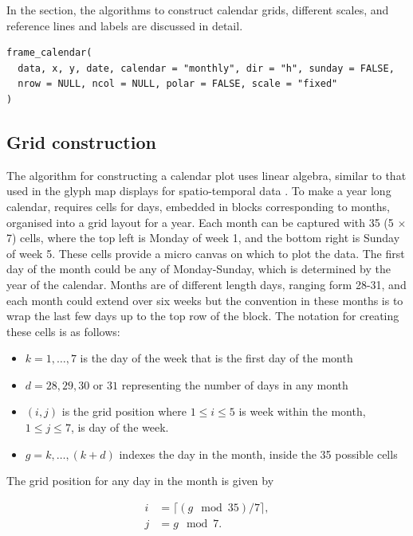 \documentclass[article]{jss}
\providecommand{\tightlist}{%
  \setlength{\itemsep}{0pt}\setlength{\parskip}{0pt}}
\begin{document}
In the section, the algorithms to construct calendar grids, different
scales, and reference lines and labels are discussed in detail.

\begin{verbatim}
frame_calendar(
  data, x, y, date, calendar = "monthly", dir = "h", sunday = FALSE, 
  nrow = NULL, ncol = NULL, polar = FALSE, scale = "fixed"
)
\end{verbatim}

\subsection{Grid construction}\label{grid-construction}

The algorithm for constructing a calendar plot uses linear algebra,
similar to that used in the glyph map displays for spatio-temporal data
\citep{Wickham2012glyph}. To make a year long calendar, requires cells
for days, embedded in blocks corresponding to months, organised into a
grid layout for a year. Each month can be captured with 35 (5 \(\times\)
7) cells, where the top left is Monday of week 1, and the bottom right
is Sunday of week 5. These cells provide a micro canvas on which to plot
the data. The first day of the month could be any of Monday-Sunday,
which is determined by the year of the calendar. Months are of different
length days, ranging form 28-31, and each month could extend over six
weeks but the convention in these months is to wrap the last few days up
to the top row of the block. The notation for creating these cells is as
follows:

\begin{itemize}
\tightlist
\item
  \(k = 1, \dots , 7\) is the day of the week that is the first day of
  the month
\item
  \(d = 28, 29, 30\) or \(31\) representing the number of days in any
  month
\item
  \((i, j)\) is the grid position where \(1 \le i \le 5\) is week within
  the month, \(1 \le j \le 7\), is day of the week.
\item
  \(g = k, \dots,(k+d)\) indexes the day in the month, inside the 35
  possible cells
\end{itemize}

The grid position for any day in the month is given by

\begin{equation}
  \begin{aligned}
  i &= \lceil (g \mod 35) / 7\rceil, \\
  j &= g \mod 7. \label{eq:grid}
  \end{aligned}
\end{equation}
\end{document}
